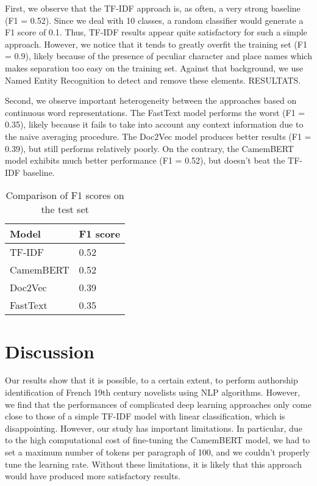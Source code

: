 \documentclass[11pt,a4paper]{article}
\begin{document}
First, we observe that the TF-IDF approach is, as often, a very strong baseline (F1 = 0.52). Since we deal with 10 classes, a random classifier would generate a F1 score of 0.1. Thus, TF-IDF results appear quite satisfactory for such a simple approach.  However, we notice that it tends to greatly overfit the training set (F1 = 0.9), likely because of the presence of peculiar character and place names which makes separation too easy on the training set. Against that background, we use Named Entity Recognition to detect and remove these elements. RESULTATS.

Second, we observe important heterogeneity between the approaches based on continuous word representations. The FastText model performs the worst (F1 = 0.35), likely because it fails to take into account any context information due to the naive averaging procedure. The Doc2Vec model produces better results (F1 = 0.39), but still performs relatively poorly. On the contrary, the CamemBERT model exhibits much better performance (F1 = 0.52), but doesn't beat the TF-IDF baseline.



\begin{table}[]
\caption{Comparison of F1 scores on the test set}
\label{compar}
\begin{center}
\begin{tabular}{|l|l|}
\hline
\textbf{Model} & \textbf{F1 score} \\ \hline
TF-IDF         & 0.52              \\ \hline
CamemBERT       & 0.52                  \\ \hline
Doc2Vec        & 0.39                  \\ \hline
FastText      & 0.35                  \\ \hline
\end{tabular}
\end{center}
\end{table}

\section{Discussion}

Our results show that it is possible, to a certain extent, to perform authorship identification of French 19th century novelists using NLP algorithms. However, we find that the performances of complicated deep learning approaches only come close  to those of a simple TF-IDF model with linear classification, which is disappointing. However, our study has important limitations. In particular, due to the high computational cost of fine-tuning the CamemBERT model, we had to set a maximum number of tokens per paragraph of 100, and we couldn't properly tune the learning rate. Without these limitations, it is likely that this approach would have produced more satisfactory results.
\end{document}

